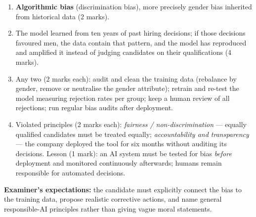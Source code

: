 \documentclass[11pt]{article}
\begin{document}
\begin{corrige}
\begin{enumerate}
\item [(a)] \textbf{Algorithmic bias} (discrimination bias), more precisely gender bias inherited from historical data (2 marks).
\item [(b)] The model learned from ten years of past hiring decisions; if those decisions favoured men, the data contain that pattern, and the model has reproduced and amplified it instead of judging candidates on their qualifications (4 marks).
\item [(c)] Any two (2 marks each): audit and clean the training data (rebalance by gender, remove or neutralise the gender attribute); retrain and re-test the model measuring rejection rates per group; keep a human review of all rejections; run regular bias audits after deployment.
\item [(d)] Violated principles (2 marks each): \emph{fairness / non-discrimination} --- equally qualified candidates must be treated equally; \emph{accountability and transparency} --- the company deployed the tool for six months without auditing its decisions. Lesson (1 mark): an AI system must be tested for bias \emph{before} deployment and monitored continuously afterwards; humans remain responsible for automated decisions.
\end{enumerate}
\textbf{Examiner's expectations:} the candidate must explicitly connect the bias to the training data, propose realistic corrective actions, and name general responsible-AI principles rather than giving vague moral statements.
\end{corrige}
\end{document}
